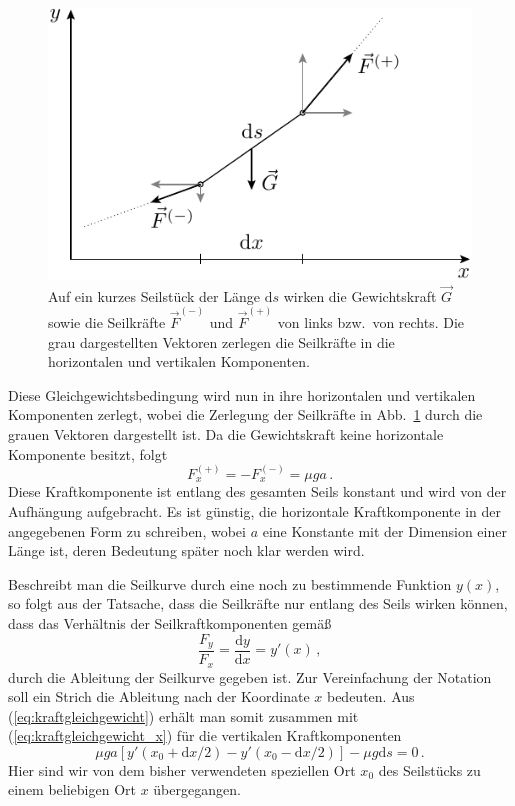 \documentclass[twocolumn,aps]{revtex4}
\begin{document}
\begin{figure}
 \includegraphics[width=0.8\columnwidth]{kraefte}
 \caption{Auf ein kurzes Seilstück der Länge $\mathrm{d}s$ wirken
	  die Gewichtskraft $\vec G$ sowie die Seilkräfte $\vec F^{(-)}$
	  und $\vec F^{(+)}$ von links bzw.\ von rechts. Die grau
	  dargestellten Vektoren zerlegen die Seilkräfte in die
	  horizontalen und vertikalen Komponenten.}
 \label{fig:kraefte}
\end{figure}

Diese Gleichgewichtsbedingung wird nun in ihre horizontalen und
vertikalen Komponenten zerlegt, wobei die Zerlegung der Seilkräfte in
Abb.~\ref{fig:kraefte} durch die grauen Vektoren dargestellt ist. Da
die Gewichtskraft keine horizontale Komponente besitzt, folgt
\begin{equation}
 F^{(+)}_x = -F^{(-)}_x = \mu g a\,.
 \label{eq:kraftgleichgewicht_x}
\end{equation}
Diese Kraftkomponente ist entlang des gesamten Seils konstant und wird
von der Aufhängung aufgebracht. Es ist günstig, die horizontale
Kraftkomponente in der angegebenen Form zu schreiben, wobei $a$ eine
Konstante mit der Dimension einer Länge ist, deren Bedeutung später
noch klar werden wird.

Beschreibt man die Seilkurve durch eine noch zu bestimmende Funktion
$y(x)$, so folgt aus der Tatsache, dass die Seilkräfte nur entlang des
Seils wirken können, dass das Verhältnis der Seilkraftkomponenten
gemäß
\begin{equation}
 \frac{F_y}{F_x} = \frac{\mathrm{d}y}{\mathrm{d}x} = y'(x)\,,
\end{equation}
durch die Ableitung der Seilkurve gegeben ist. Zur Vereinfachung der
Notation soll ein Strich die Ableitung nach der Koordinate $x$
bedeuten. Aus (\ref{eq:kraftgleichgewicht}) erhält man somit zusammen
mit (\ref{eq:kraftgleichgewicht_x}) für die vertikalen
Kraftkomponenten
\begin{equation}
 \mu ga\left[y'(x_0+\mathrm{d}x/2)-y'(x_0-\mathrm{d}x/2)\right]-\mu
 g\mathrm{d}s = 0\,.
\end{equation}
Hier sind wir von dem bisher verwendeten speziellen Ort $x_0$ des
Seilstücks zu einem beliebigen Ort $x$ übergegangen.
\end{document}
